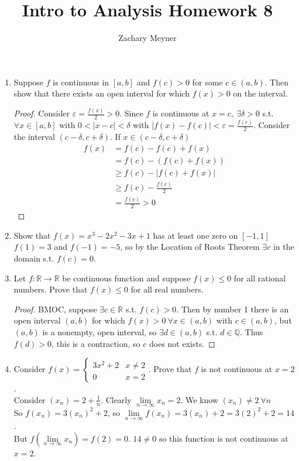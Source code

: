 \documentclass[12pt]{article}
\title{\large Intro to Analysis Homework 8}
\author{\large Zachary Meyner}
\date{}
\begin{document}
\maketitle
\begin{enumerate}
    \item Suppose $f$ is continuous in $[a,b]$ and $f(c) > 0$ for some $c \in (a,b)$. Then show that 
    there exists an open interval for which $f(x) >0$ on the interval.
    \begin{proof}
        Consider $\varepsilon = \frac{f(x)}{2} > 0$. Since $f$ is continuous at $x=c, \ \exists \delta > 0$ s.t. $\forall x \in [a,b]$ 
        with $0 < |x-c| < \delta$ with $|f(x) - f(c)| < \varepsilon = \frac{f(c)}{2}$. Consider the interval $(c-\delta, c + \delta)$.
        If $x \in (c-\delta, c+\delta)$
        \begin{align*}
            f(x) &= f(c)-f(c)+f(x) \\
            &= f(c) - (f(c)+f(x)) \\
            &\geq f(c) - |f(c)+f(x)| \\
            &\geq f(c) - \frac{f(c)}{2} \\
            &= \frac{f(c)}{2} > 0
        \end{align*}
    \end{proof}
    \item Show that $f(x) = x^3-2x^2-3x+1$ has at least one zero on $[-1, 1]$ \\
    $f(1) = 3$ and $f(-1) = -5$, so by the Location of Roots Theorem $\exists c$ in the domain s.t. 
    $f(c) = 0$.
    
    \item Let $f: \mathbb{R} \to \mathbb{R}$ be continuous function and suppose $f(x) \leq 0$ for all rational numbers. 
    Prove that $f(x) \leq 0$ for all real numbers.
    \begin{proof}
        BMOC, suppose $\exists c \in \mathbb{R}$ s.t. $f(c) > 0$. Then by number 1 there is an open 
        interval $(a,b)$ for which $f(x) > 0 \ \forall x \in (a,b)$ with $c \in (a,b)$, but $(a,b)$ is a nonempty, 
        open interval, so $\exists d \in (a,b)$ s.t. $d \in \mathbb{Q}$. Thus $f(d) > 0$, this is a contraction, so $c$ does 
        not exists.
    \end{proof}

    \item Consider $f(x) = \begin{cases}
                                3x^2+2 &x \neq 2 \\
                                0 &x =2
                            \end{cases}$.
    Prove that $f$ is not continuous at $x=2$. \\
    Consider $(x_n) = 2 + \frac{1}{n}$. Clearly $\lim\limits_{n \to \infty} x_n = 2$. We know $(x_n) \neq 2 \ \forall n$ \\
    So $f(x_n) = 3(x_n)^2 + 2$, so $\lim\limits_{n \to \infty}f(x_n) = 3(x_n)+2 = 3{(2)}^{2}+2 = 14$.  \\
    But $f(\lim\limits_{n \to \infty} x_n) = f(2) = 0$. $14 \neq 0$ so this function is not continuous at $x=2$.


\end{enumerate}
\end{document}
